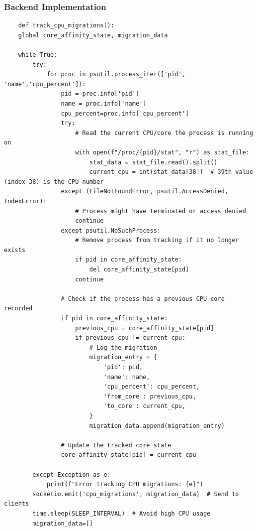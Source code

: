 \documentclass[12pt]{article}
\begin{document}
\subsubsection{Backend Implementation}
\begin{verbatim}
    def track_cpu_migrations():
    global core_affinity_state, migration_data

    while True:
        try:
            for proc in psutil.process_iter(['pid', 'name','cpu_percent']):
                pid = proc.info['pid']
                name = proc.info['name']
                cpu_percent=proc.info['cpu_percent']
                try:
                    # Read the current CPU/core the process is running on
                    with open(f"/proc/{pid}/stat", "r") as stat_file:
                        stat_data = stat_file.read().split()
                        current_cpu = int(stat_data[38])  # 39th value (index 38) is the CPU number
                except (FileNotFoundError, psutil.AccessDenied, IndexError):
                    # Process might have terminated or access denied
                    continue
                except psutil.NoSuchProcess:
                    # Remove process from tracking if it no longer exists
                    if pid in core_affinity_state:
                        del core_affinity_state[pid]
                    continue

                # Check if the process has a previous CPU core recorded
                if pid in core_affinity_state:
                    previous_cpu = core_affinity_state[pid]
                    if previous_cpu != current_cpu:
                        # Log the migration
                        migration_entry = {
                            'pid': pid,
                            'name': name,
                            'cpu_percent': cpu_percent,
                            'from_core': previous_cpu,
                            'to_core': current_cpu,
                        }
                        migration_data.append(migration_entry)

                # Update the tracked core state
                core_affinity_state[pid] = current_cpu

        except Exception as e:
            print(f"Error tracking CPU migrations: {e}")
        socketio.emit('cpu_migrations', migration_data)  # Send to clients
        time.sleep(SLEEP_INTERVAL)  # Avoid high CPU usage
        migration_data=[]
\end{verbatim}
\end{document}
